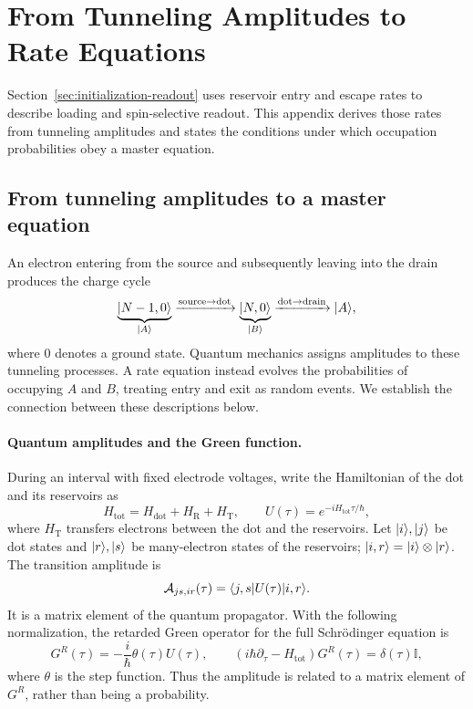 \FloatBarrier
\section{From Tunneling Amplitudes to Rate Equations}
\label{app:open-system-dynamics}

Section~\ref{sec:initialization-readout} uses reservoir entry and escape
rates to describe loading and spin-selective readout. This appendix
derives those rates from tunneling amplitudes and states the conditions
under which occupation probabilities obey a master equation.

\subsection{From tunneling amplitudes to a master equation}
\label{sec:amplitudes-to-master-equation}

An electron entering from the source and subsequently leaving
into the drain produces the charge cycle
\[
 \underbrace{\lvert N-1,0\rangle}_{\lvert A\rangle}
 \xrightarrow{\text{source}\to\text{dot}}
 \underbrace{\lvert N,0\rangle}_{\lvert B\rangle}
 \xrightarrow{\text{dot}\to\text{drain}}\lvert A\rangle,
\]
where $0$ denotes a ground state. Quantum mechanics assigns
amplitudes to these tunneling processes. A rate equation instead
evolves the probabilities of occupying $A$ and $B$, treating entry
and exit as random events. We establish the connection between
these descriptions below.

\paragraph{Quantum amplitudes and the Green function.}
During an interval with fixed electrode voltages, write the
Hamiltonian of the dot and its reservoirs as
\begin{equation}
 H_{\mathrm{tot}}=H_{\mathrm{dot}}+H_{\mathrm R}+H_{\mathrm T},
 \qquad U(\tau)=e^{-iH_{\mathrm{tot}}\tau/\hbar},
 \label{eq:rates-total-propagator}
\end{equation}
where $H_{\mathrm T}$ transfers electrons between the dot and
the reservoirs. Let $\lvert i\rangle,\lvert j\rangle$ be dot states and
$\lvert r\rangle,\lvert s\rangle$ be many-electron states of the reservoirs;
$\lvert i,r\rangle=\lvert i\rangle\otimes\lvert r\rangle$. The transition amplitude is
\begin{equation}
 \mathcal A_{js,ir}(\tau)=\bra{j,s}U(\tau)\ket{i,r}.
 \label{eq:rates-quantum-amplitude}
\end{equation}
It is a matrix element of the quantum propagator. With the
following normalization, the retarded Green operator for the
full Schr\"odinger equation is
\begin{equation}
 G^R(\tau)=-\frac{i}{\hbar}\theta(\tau)U(\tau),
 \qquad
 (i\hbar\partial_\tau-H_{\mathrm{tot}})G^R(\tau)
       =\delta(\tau)\mathbb I,
 \label{eq:rates-quantum-green-function}
\end{equation}
where $\theta$ is the step function. Thus the amplitude is related
to a matrix element of $G^R$, rather than being a probability.

